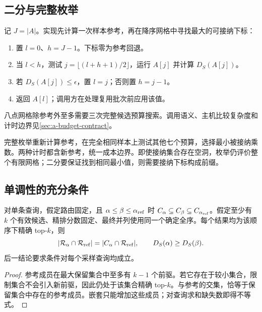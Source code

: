 \subsection{二分与完整枚举}

记 $J=|A|$。实现先计算一次样本参考，再在降序网格中寻找最大的可接纳下标：
\par\noindent\begin{minipage}{\linewidth}
\begin{enumerate}[leftmargin=*,itemsep=0.15em]
\item 置 $l=0$、$h=J-1$。下标零为参考回退。
\item 当 $l<h$，测试 $j=\lfloor(l+h+1)/2\rfloor$，运行 $A[j]$ 并计算 $D_S(A[j])$。
\item 若 $D_S(A[j])\leq\epsilon$，置 $l=j$；否则置 $h=j-1$。
\item 返回 $A[l]$；调用方在处理复用批次前应用该值。
\end{enumerate}
\end{minipage}\par\medskip
八点网格除参考外至多需要三次完整候选预算搜索。调用语义、主机比较复杂度和计时边界见\cref{sec:a-budget-contract}。

完整枚举重新计算参考，在完全相同样本上测试其他七个预算，选择最小被接纳乘数。两种计时都含新参考，统一成本边界。即使接纳集合存在空洞，枚举仍评价整个有限网格；二分要保证找到相同最小值，则需要接纳下标构成前缀。

\subsection{单调性的充分条件}

\par\noindent\begin{minipage}{\linewidth}
\begin{proposition}[嵌套候选保留参考成员]
\label{prop:6-monotonicity}
对单条查询，假定路由固定，且 $\alpha\leq\beta\leq\alpha_{\rm ref}$ 时
$C_\alpha\subseteq C_\beta\subseteq C_{\alpha_{\rm ref}}$。假定至少有 $k$ 个有效候选、精排分数固定、最终并列使用同一个确定全序。每个结果均为该顺序下精确 top-$k$，则
\begin{equation}
 |\mathcal R_\alpha\cap\mathcal R_{\rm ref}|
 =|C_\alpha\cap\mathcal R_{\rm ref}|,
 \qquad D_S(\alpha)\geq D_S(\beta).
 \label{eq:6-monotonicity}
\end{equation}
后一结论要求条件对每个采样查询均成立。
\end{proposition}
\begin{proof}
参考成员在最大保留集合中至多有 $k-1$ 个前驱。若它存在于较小集合，限制集合不会引入新前驱，因此仍处于该集合精确 top-$k$。与参考的交集，恰等于保留集合中存在的参考成员。嵌套只能增加这些成员；对查询求和缺失数即得不等式。
\end{proof}
\end{minipage}\par\medskip

